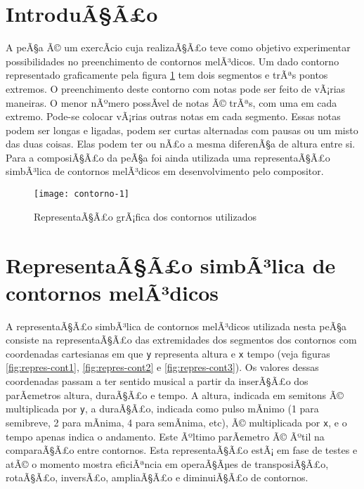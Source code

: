 \documentclass[12pt]{article}
\begin{document}
\graphicspath{{figs-out/}}



\section{IntroduÃ§Ã£o}
\label{sec:introducao}

A peÃ§a  Ã© um
exercÃ­cio cuja realizaÃ§Ã£o teve como objetivo experimentar
possibilidades no preenchimento de contornos melÃ³dicos. Um dado
contorno representado graficamente pela figura \ref{fig:contorno-1}
tem dois segmentos e trÃªs pontos extremos. O preenchimento deste
contorno com notas pode ser feito de vÃ¡rias maneiras. O menor nÃºmero
possÃ­vel de notas Ã© trÃªs, com uma em cada extremo. Pode-se colocar
vÃ¡rias outras notas em cada segmento. Essas notas podem ser longas e
ligadas, podem ser curtas alternadas com pausas ou um misto das duas
coisas. Elas podem ter ou nÃ£o a mesma diferenÃ§a de altura entre si.
Para a composiÃ§Ã£o da peÃ§a foi ainda utilizada uma representaÃ§Ã£o
simbÃ³lica de contornos melÃ³dicos em desenvolvimento pelo compositor.

\begin{figure}[h]
  \centering
  \texttt{[image: contorno-1]}
  \caption{RepresentaÃ§Ã£o grÃ¡fica dos contornos utilizados}
  \label{fig:contorno-1}
\end{figure}

\section{RepresentaÃ§Ã£o simbÃ³lica de contornos melÃ³dicos}
\label{sec:repr-simb-de}

A representaÃ§Ã£o simbÃ³lica de contornos melÃ³dicos utilizada nesta peÃ§a
consiste na representaÃ§Ã£o das extremidades dos segmentos dos contornos
com coordenadas cartesianas em que \texttt{y} representa altura e
\texttt{x} tempo (veja figuras \ref{fig:repres-cont1},
\ref{fig:repres-cont2} e \ref{fig:repres-cont3}). Os valores dessas
coordenadas passam a ter sentido musical a partir da inserÃ§Ã£o dos
parÃ¢metros altura, duraÃ§Ã£o e tempo. A altura, indicada em semitons Ã©
multiplicada por \texttt{y}, a duraÃ§Ã£o, indicada como pulso mÃ­nimo (1
para semibreve, 2 para mÃ­nima, 4 para semÃ­nima, etc), Ã© multiplicada
por \texttt{x}, e o tempo apenas indica o andamento. Este Ãºltimo
parÃ¢metro Ã© Ãºtil na comparaÃ§Ã£o entre contornos. Esta representaÃ§Ã£o
estÃ¡ em fase de testes e atÃ© o momento mostra eficiÃªncia em operaÃ§Ãµes
de transposiÃ§Ã£o, rotaÃ§Ã£o, inversÃ£o, ampliaÃ§Ã£o e diminuiÃ§Ã£o de
contornos.
\end{document}
